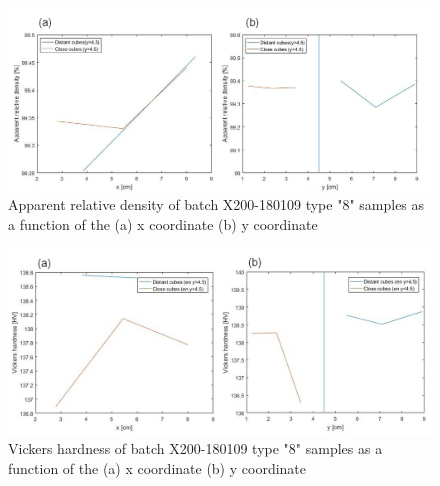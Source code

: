 \begin{figure}[ht]
\centering
\centerline{\includegraphics[scale=0.55]{Images/180109-8Dxy}}
\decoRule
\caption[Average apparent relative density of batch X200-180109 type "8" samples as a function of the (a) x coordinate (b) y coordinate]{Apparent relative density of batch X200-180109 type "8" samples as a function of the (a) x coordinate (b) y coordinate}
\label{180109-8Dxy}
\end{figure} 

\begin{figure}[ht]
\centering
\centerline{\includegraphics[scale=0.55]{Images/180109-8Hxy}}
\decoRule
\caption[Average Vickers hardness of batch X200-180109 type "8" samples as a function of the (a) x coordinate (b) y coordinate]{Vickers hardness of batch X200-180109 type "8" samples as a function of the (a) x coordinate (b) y coordinate}
\label{180109-8Hxy}
\end{figure} 